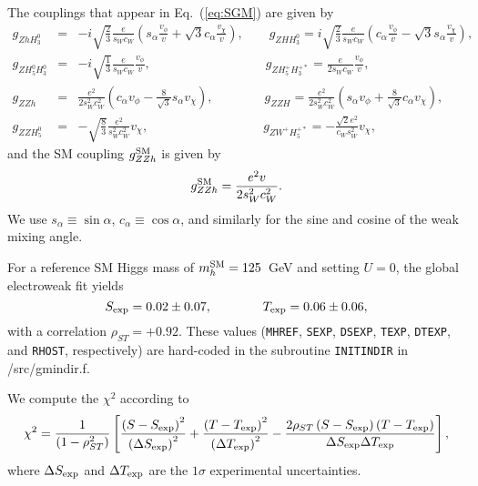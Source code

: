 \documentclass[11pt]{article}
\begin{document}
The couplings that appear in Eq.~(\ref{eq:SGM}) are given by~\cite{HKL}
\begin{eqnarray}
	g_{ZhH_3^0} &=& -i\sqrt{\frac{2}{3}}\frac{e}{s_Wc_W}\left(s_\alpha \frac{v_\phi}{v} + \sqrt{3} c_\alpha \frac{v_\chi}{v} \right), \qquad
	g_{ZHH_3^0} = i\sqrt{\frac{2}{3}}\frac{e}{s_Wc_W}\left(c_\alpha \frac{v_\phi}{v} - \sqrt{3} s_\alpha \frac{v_\chi}{v} \right), \nonumber \\
	g_{ZH_5^0 H_3^0} &=& -i \sqrt{\frac{1}{3}} \frac{e}{s_Wc_W}\frac{v_\phi}{v}, \qquad \qquad \qquad \qquad \quad
	g_{ZH_5^+H_3^{+*}} = \frac{e}{2 s_Wc_W}\frac{v_\phi}{v}, \nonumber \\
	g_{ZZh} &=& \frac{e^2}{2 s_W^2 c_W^2} \left(c_\alpha v_\phi - \frac{8}{\sqrt{3}} s_\alpha v_\chi \right),  \qquad \qquad
	g_{ZZH} = \frac{e^2}{2 s_W^2 c_W^2} \left(s_\alpha v_\phi + \frac{8}{\sqrt{3}} c_\alpha v_\chi \right), \nonumber \\
	g_{ZZ H_5^0} &=& -\sqrt{\frac{8}{3}} \frac{e^2}{s_W^2 c_W^2} v_{\chi}, \qquad \qquad \qquad \qquad \quad
	g_{Z W^+ H_5^{+*}} = -\frac{\sqrt{2} e^2}{c_W s_W^2} v_{\chi},
\end{eqnarray}
and the SM coupling $g_{ZZh}^{\rm SM}$ is given by
\begin{equation}
	g_{ZZh}^{\rm SM} = \frac{e^2 v}{2 s_W^2 c_W^2}.
\end{equation}
We use $s_{\alpha} \equiv \sin\alpha$, $c_{\alpha} \equiv \cos\alpha$, and similarly for the sine and cosine of the weak mixing angle.

For a reference SM Higgs mass of $m_h^{\rm SM} = 125$~GeV and setting $U = 0$, the global electroweak fit yields~\cite{PDG2018}
\begin{equation}
	S_{\rm exp} = 0.02 \pm 0.07, \qquad \qquad
	T_{\rm exp} = 0.06 \pm 0.06,
\end{equation}
with a correlation $\rho_{ST} = +0.92$.  These values ({\tt MHREF}, {\tt SEXP}, {\tt DSEXP}, {\tt TEXP}, {\tt DTEXP}, and {\tt RHOST}, respectively) are hard-coded in the subroutine {\tt INITINDIR} in /src/gmindir.f.

We compute the $\chi^2$ according to
\begin{equation}
	\chi^2 =  \frac{1}{\left(1-\rho_{ST}^2\right)}\left[\frac{\left(S-S_{\rm exp}\right)^2}{\left( \Delta S_{\rm exp} \right)^2}+\frac{\left(T-T_{\rm exp}\right)^2}{\left( \Delta T_{\rm exp} \right)^2}-\frac{2 \rho_{ST} \left(S-S_{\rm exp}\right)\left(T-T_{\rm exp}\right)}{\Delta S_{\rm exp} \Delta T_{\rm exp}}\right],
\end{equation}
where $\Delta S_{\rm exp}$ and $\Delta T_{\rm exp}$ are the $1\sigma$ experimental uncertainties.
\end{document}
